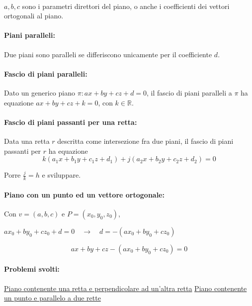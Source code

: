 \documentclass[a4paper]{article}
\begin{document}
                \paragraph{}
                        $a, b, c$ sono i parametri direttori del piano, o anche i coefficienti dei vettori ortogonali al piano.

                \paragraph{Piani paralleli:}
                        Due piani sono paralleli se differiscono unicamente per il coefficiente $d$.

                \paragraph{Fascio di piani paralleli:}
                        Dato un generico piano $\pi: ax + by + cz + d = 0$, il fascio di piani paralleli a $\pi$ ha equazione $ax + by + cz + k = 0$, con $k \in \mathbb{R}$.

                \paragraph{Fascio di piani passanti per una retta:}
                        Data una retta $r$ descritta come intersezione fra due piani,
                        il fascio di piani passanti per $r$ ha equazione
                        \[
                                k(a_1 x + b_1 y + c_1 z + d_1) + j(a_2 x + b_2 y + c_2 z + d_2) = 0
                        \]

                        Porre $\frac{j}{k} = h$ e sviluppare.

                \paragraph{Piano con un punto ed un vettore ortogonale:}
                        Con $v = (a, b, c)$ e $P = (x_0, y_0, z_0)$,

                        $a x_0 + b y_0 + c z_0 + d = 0 \quad \rightarrow \quad d = -(a x_0 + b y_0 + c z_0)$

                        \[ a x + b y + c z - (a x_0 + b y_0 + c z_0) = 0 \]

                \paragraph{Problemi svolti:}\hfill\newline
                        \href{https://it.answers.yahoo.com/question/index?qid=20100117132609AAuoK0i}{Piano contenente una retta e perpendicolare ad un'altra retta}\newline
                        \href{http://www.youmath.it/forum/algebra-lineare/3410-piano-passante-per-un-punto-e-parallelo-a-due-rette-esercizio.html}{Piano contenente un punto e parallelo a due rette}
\end{document}
